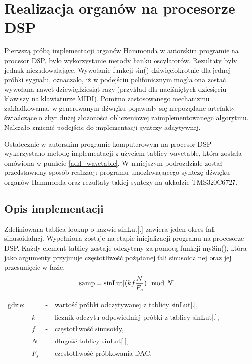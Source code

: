 \section{Realizacja organów na procesorze DSP}
Pierwszą próbą implementacji organów Hammonda w autorskim programie na procesor DSP, było wykorzystanie metody banku oscylatorów. Rezultaty były jednak niezadowalające. Wywołanie funkcji sin() dziwięciokrotnie dla jednej próbki sygnału, oznaczało, iż w podejściu polifonicznym mogła ona zostać wywołana nawet dziewiędziesiąt razy (przykład dla naciśniętych dziesięciu klawiszy na klawiaturze MIDI).
Pomimo zastosowanego mechanizmu zakładkowania, w generowanym dźwięku pojawiały się niepożądane artefakty świadczące o zbyt dużej złożoności obliczeniowej zaimplementowanego algorytmu. Należało zmienić podejście do implementacji syntezy addytywnej.

Ostatecznie w autorskim programie komputerowym na procesor DSP wykorzystano metodę implementacji z użyciem tablicy wavetable, która została omówiona w punkcie \ref{add_wavetable}. W niniejszym podrozdziale został przedstawiony sposób realizacji programu umożliwiającego syntezę dźwięku organów Hammonda oraz rezultaty takiej syntezy na układzie TMS320C6727.

\subsection{Opis implementacji}
Zdefiniowana tablica lookup o nazwie sinLut[.] zawiera jeden okres fali sinusoidalnej. Wypełniona zostaje na etapie inicjalizacji programu na procesorze DSP. Każdy element tablicy zostaje odczytany za pomocą funkcji mySin(), która jako argumenty przyjmuje częstotliwość pożądanej fali sinusoidalnej oraz jej przesunięcie w fazie.
\begin{equation} \label{equ:addit_sinLut}
\text{samp} = \text{sinLut}[(kf\frac{N}{F_s})\mod{N}] \\  
\end{equation}
\begin{tabular}{ l l l l}
	gdzie: & \text{samp} &  - & wartość próbki odczytywanej z tablicy sinLut[.], \\
	& $k$ &  - & licznik odczytu odpowiedniej próbki z tablicy sinLut[.], \\
	& $f$ & - & częstotliwość sinusoidy, \\
	& $N$ & - & długość tablicy sinLut[.], \\
	& $F_s$ & - & częstotliwość próbkowania DAC. \\
\end{tabular} \\

